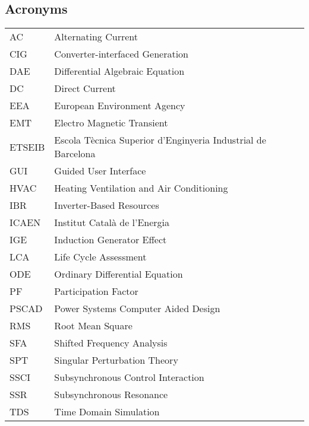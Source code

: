 \subsection*{Acronyms}
\begin{tabular}{l@{\hspace{1cm}} l}
  AC & Alternating Current \\
  CIG & Converter-interfaced Generation \\
  DAE & Differential Algebraic Equation\\
  DC & Direct Current \\
  EEA & European Environment Agency\\
  EMT & Electro Magnetic Transient\\
  ETSEIB & Escola Tècnica Superior d'Enginyeria Industrial de Barcelona\\
  GUI & Guided User Interface\\
  HVAC & Heating Ventilation and Air Conditioning \\
  IBR & Inverter-Based Resources \\
  ICAEN & Institut Català de l'Energia \\
  IGE & Induction Generator Effect\\
  LCA & Life Cycle Assessment \\
  ODE & Ordinary Differential Equation \\
  PF & Participation Factor\\
  PSCAD & Power Systems Computer Aided Design\\
  RMS & Root Mean Square\\
  SFA &Shifted Frequency Analysis\\
  SPT & Singular Perturbation Theory\\
  SSCI & Subsynchronous Control Interaction\\
  SSR & Subsynchronous Resonance\\
  TDS & Time Domain Simulation\\
  
\end{tabular}\par